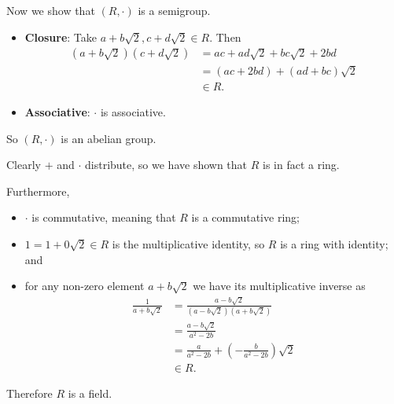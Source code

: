 \begin{enumerate}
    Now we show that $(R, \cdot)$ is a semigroup.
    \begin{itemize}
        \item \textbf{Closure}: Take $a+b\sqrt2, c+d\sqrt2 \in R$. Then
        \begin{align*}
            (a+b\sqrt2)(c+d\sqrt2) &= ac + ad\sqrt2 + bc\sqrt2 + 2bd\\
            &= (ac+2bd) + (ad+bc)\sqrt2\\
            &\in R.
        \end{align*}
        \item \textbf{Associative}: $\cdot$ is associative.
    \end{itemize}
    So $(R, \cdot)$ is an abelian group.

    Clearly $+$ and $\cdot$ distribute, so we have shown that $R$ is in fact a ring.

    Furthermore,
    \begin{itemize}
        \item $\cdot$ is commutative, meaning that $R$ is a commutative ring;
        \item $1 = 1 + 0\sqrt2 \in R$ is the multiplicative identity, so $R$ is a ring with identity; and
        \item for any non-zero element $a+b\sqrt2$ we have its multiplicative inverse as
        \begin{align*}
            \frac{1}{a+b\sqrt2} &= \frac{a-b\sqrt2}{(a-b\sqrt2)(a+b\sqrt2)}\\
            &= \frac{a-b\sqrt2}{a^2-2b}\\
            &= \frac{a}{a^2-2b} + \left(-\frac{b}{a^2-2b}\right)\sqrt2\\
            &\in R.
        \end{align*}
    \end{itemize}
    Therefore $R$ is a field.


\end{enumerate}
